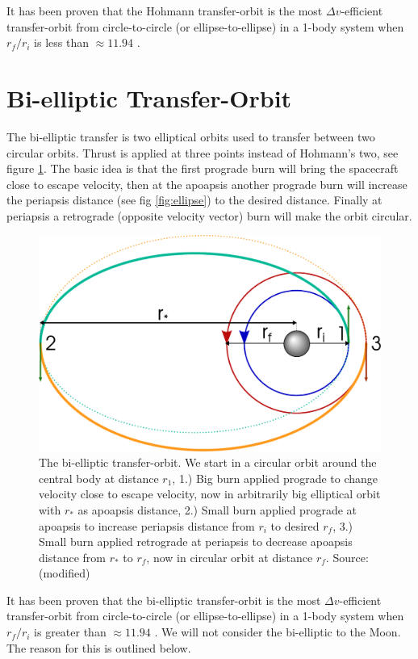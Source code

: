 It has been proven that the Hohmann transfer-orbit is the most $\Delta v$-efficient transfer-orbit from circle-to-circle (or ellipse-to-ellipse) in a 1-body system when $r_f/r_i$ is less than $\approx 11.94$ \cite{Prussing1992} \cite{Peet} \cite{Biesbroek2000}.


\section{Bi-elliptic Transfer-Orbit}
The bi-elliptic transfer is two elliptical orbits used to transfer between two circular orbits. Thrust is applied at three points instead of Hohmann's two, see figure \ref{fig:bi-elliptical}. The basic idea is that the first prograde burn will bring the spacecraft close to escape velocity, then at the apoapsis another prograde burn will increase the periapsis distance (see fig \ref{fig:ellipse}) to the desired distance. Finally at periapsis a retrograde (opposite velocity vector) burn will make the orbit circular.

\begin{figure}[ht!]
\centering
\includegraphics[scale=0.53]{fig/bi-elliptic.pdf}
\caption{The bi-elliptic transfer-orbit. We start in a circular orbit around the central body at distance $r_1$, 1.) Big burn applied prograde to change velocity close to escape velocity, now in arbitrarily big elliptical orbit with $r_*$ as apoapsis distance, 2.) Small burn applied prograde at apoapsis to increase periapsis distance from $r_i$ to desired $r_f$, 3.) Small burn applied retrograde at periapsis to decrease apoapsis distance from $r_*$ to $r_f$, now in circular orbit at distance $r_f$. Source: \cite{fig-bi-elliptical} (modified)}
\label{fig:bi-elliptical}
\end{figure}
It has been proven that the bi-elliptic transfer-orbit is the most $\Delta v$-efficient transfer-orbit from circle-to-circle (or ellipse-to-ellipse) in a 1-body system when $r_f/r_i$ is greater than $\approx 11.94$ \cite{Prussing1992} \cite{Peet}. We will not consider the bi-elliptic to the Moon. The reason for this is outlined below.

